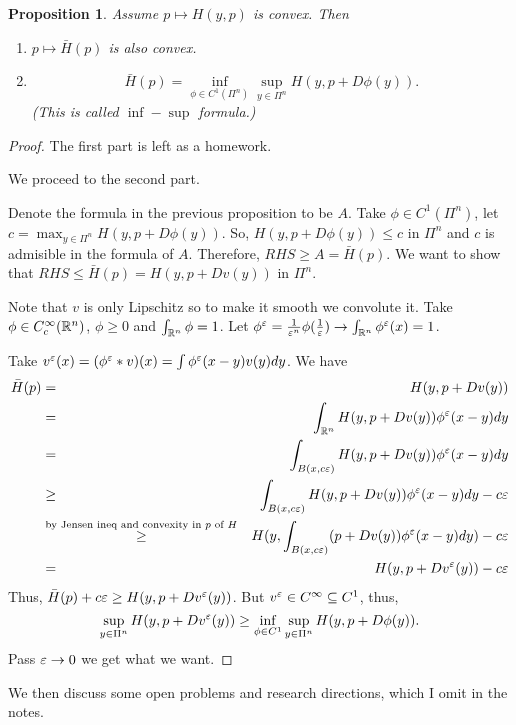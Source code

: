\documentclass[11pt, oneside]{amsart}   	%
\newtheorem{proposition}{Proposition}
\begin{document}
\begin{proposition}
	Assume $p\mapsto H(y,p)$ is convex. Then
	\begin{enumerate}
	\item $p\mapsto \bar{H}(p)$ is also convex.
	
	\item $$ \bar{H}(p)=\inf_{\phi\in C^1(\Pi^n)} \sup_{y\in \Pi^n} H(y, p+D\phi(y)).$$
	(This is called $\inf-\sup$ formula.)
	\end{enumerate}
\end{proposition}
\begin{proof}
The first part is left as a homework.

We proceed to the second part.

Denote the formula in the previous proposition to be $A$.
Take $\phi \in C^1(\Pi^n)$, let $c=\max_{y\in \Pi^n} H(y, p + D\phi(y))$. So, $H(y, p+D\phi(y)) \le c$ in $\Pi^n$ and $c$ is admisible in the formula of $A$. Therefore, $RHS\ge A=\bar{H}(p)$. We want to show that $RHS\le \bar{H}(p)=H(y, p + Dv(y))$ in $\Pi^n$.

Note that $v$ is only Lipschitz so to make it smooth we convolute it. Take $\phi\in C^\infty_c(\mathbb{R}^n)$, $\phi \ge 0$ and $\int_{\mathbb{R}^n} \phi =1$. Let $\phi^\varepsilon =\frac{1}{\varepsilon^n} \phi(\frac{1}{\varepsilon}) \to \int_{\mathbb{R}^n}\phi^\varepsilon(x)=1$.

Take $v^\varepsilon(x)=(\phi^\varepsilon * v)(x)=\int \phi^\varepsilon(x-y)v(y)dy$. We have
\begin{eqnarray*}
	\bar{H}(p) &=& H(y, p+Dv(y))\\
			&=& \int_{\mathbb{R}^n} H(y, p + Dv(y))\phi^\varepsilon(x-y)dy\\
			&=& \int_{B(x, c\varepsilon)} H(y, p+ Dv(y))\phi^\varepsilon(x-y)dy\\
			&\ge& \int_{B(x,c\varepsilon)} H(y, p + Dv(y))\phi^\varepsilon(x-y)dy -c\varepsilon\\
			&\overset{\text{by Jensen ineq and convexity in $p$ of $H$}}\ge& H(y,\int_{B(x,c\varepsilon)}(p+Dv(y))\phi^\varepsilon(x-y)dy) - c\varepsilon\\
			&=& H(y, p+Dv^\varepsilon(y))-c\varepsilon
\end{eqnarray*}
Thus, $\bar{H}(p)+c\varepsilon \ge H(y, p+ Dv^\varepsilon(y))$. But $v^\varepsilon \in C^\infty \subseteq C^1$, thus,
$$\sup_{y\in\Pi^n} H(y,p+ Dv^\varepsilon(y))\ge \inf_{\phi\in C^1} \sup_{y\in\Pi^n}H(y, p+D\phi(y)).$$
Pass $\varepsilon\to0$ we get what we want.
\end{proof}

We then discuss some open problems and research directions, which I omit in the notes.
\end{document}
